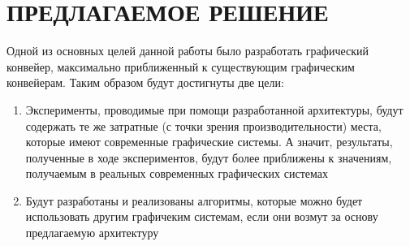 \chapter{ПРЕДЛАГАЕМОЕ РЕШЕНИЕ} \label{ch3}
Одной из основных целей данной работы было разработать графический конвейер, максимально приближенный к существующим графическим конвейерам. Таким образом будут достигнуты две цели:
\begin{enumerate}[1.] 
	\item Эксперименты, проводимые при помощи разработанной архитектуры, будут содержать те же затратные (с точки зрения производительности) места, которые имеют современные графические системы. А значит, результаты, полученные в ходе экспериментов, будут более приближены к значениям, получаемым в реальных современных графических системах
	\item Будут разработаны и реализованы алгоритмы, которые можно будет использовать другим графичеким системам, если они возмут за основу предлагаемую архитектуру
\end{enumerate}







%
